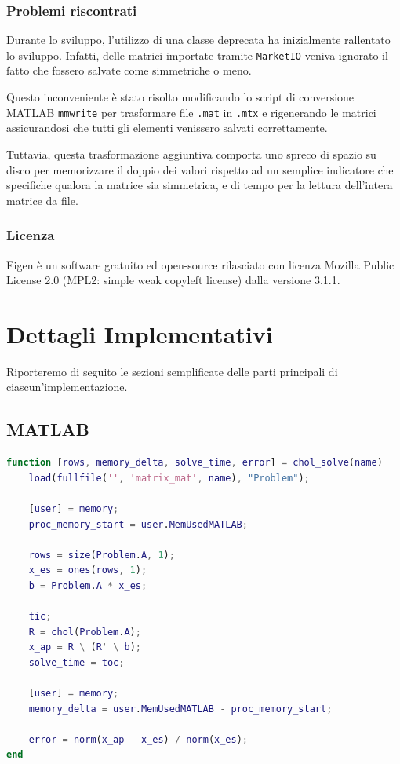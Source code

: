 \documentclass[11pt,italian]{article}
\begin{document}
\subsubsection{Problemi riscontrati}
Durante lo sviluppo, l'utilizzo di una classe deprecata ha inizialmente rallentato lo sviluppo. Infatti, delle matrici importate tramite \lstinline{MarketIO} veniva ignorato il fatto che fossero salvate come simmetriche o meno.

Questo inconveniente è stato risolto modificando lo script di conversione MATLAB \lstinline{mmwrite} per trasformare file \lstinline{.mat} in \lstinline{.mtx} e rigenerando le matrici assicurandosi che tutti gli elementi venissero salvati correttamente.

Tuttavia, questa trasformazione aggiuntiva comporta uno spreco di spazio su disco per memorizzare il doppio dei valori rispetto ad un semplice indicatore che specifiche qualora la matrice sia simmetrica, e di tempo per la lettura dell'intera matrice da file.

\subsubsection{Licenza}
Eigen è un software gratuito ed open-source rilasciato con licenza Mozilla Public License 2.0 (MPL2: simple weak copyleft license) dalla versione 3.1.1.

\newpage
\section{Dettagli Implementativi}
Riporteremo di seguito le sezioni semplificate delle parti principali di ciascun'implementazione.

\subsection{MATLAB}
\begin{lstlisting}[language=Matlab,emph={ones},caption=C++: Algoritmo principale,label=fig:code-cpp-algo]
function [rows, memory_delta, solve_time, error] = chol_solve(name)
    load(fullfile('', 'matrix_mat', name), "Problem");

    [user] = memory;
    proc_memory_start = user.MemUsedMATLAB;

    rows = size(Problem.A, 1);
    x_es = ones(rows, 1);
    b = Problem.A * x_es;

    tic;
    R = chol(Problem.A);
    x_ap = R \ (R' \ b);
    solve_time = toc;

    [user] = memory;
    memory_delta = user.MemUsedMATLAB - proc_memory_start;

    error = norm(x_ap - x_es) / norm(x_es);
end
\end{lstlisting}
\end{document}
